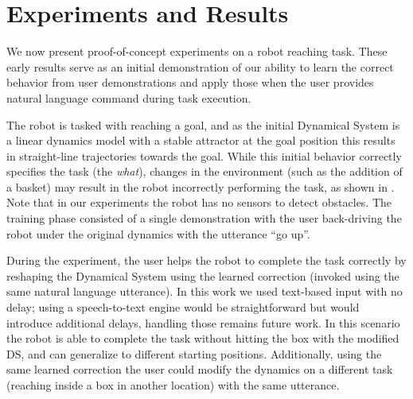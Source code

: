 \section{Experiments and Results}
\label{sec:results}

We now present proof-of-concept experiments on a robot reaching task.
These early results serve as an initial demonstration of our ability to learn the correct behavior from user demonstrations and apply those when the user provides natural language command during task execution.

The robot is tasked with reaching a goal, and as the initial Dynamical System is a linear dynamics model with a stable attractor at the goal position this results in straight-line trajectories towards the goal.
While this initial behavior correctly specifies the task (the \emph{what}), changes in the environment (such as the addition of a basket) may result in the robot incorrectly performing the task, as shown in .
Note that in our experiments the robot has no sensors to detect obstacles.
The training phase consisted of a single demonstration with the user back-driving the robot under the original dynamics with the utterance ``go up''.

During the experiment, the user helps the robot to complete the task correctly by reshaping the Dynamical System using the learned correction (invoked using the same natural language utterance).
In this work we used text-based input with no delay; using a speech-to-text engine would be straightforward but would introduce additional delays, handling those remains future work.
In this scenario the robot is able to complete the task without hitting the box with the modified DS, and can generalize to different starting positions.
Additionally, using the same learned correction the user could modify the dynamics on a different task (reaching inside a box in another location) with the same utterance.

